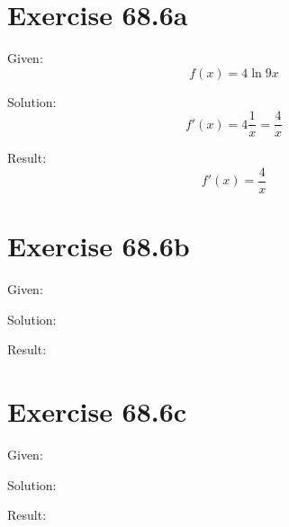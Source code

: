 \documentclass[a4paper, 10pt]{scrartcl}
\begin{document}
\section{Exercise 68.6a}

Given:
\[f(x) = 4\ln{9x}\]

Solution:
\[f'(x) = 4\frac{1}{x} = \frac{4}{x}\]

Result:
\[f'(x) = \frac{4}{x}\]

\section{Exercise 68.6b}

Given:

Solution:

Result:

\section{Exercise 68.6c}

Given:

Solution:

Result:
\end{document}
